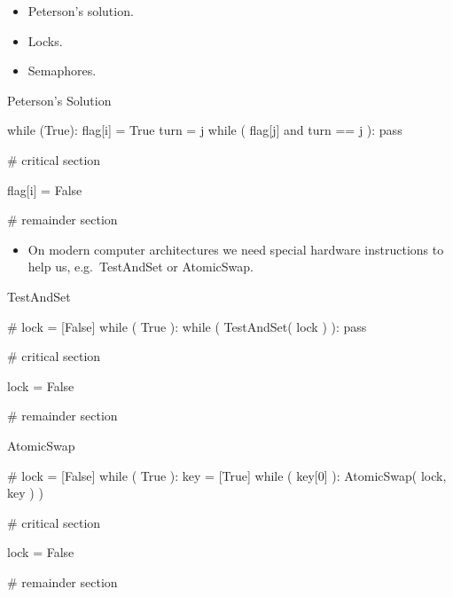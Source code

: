 \documentclass{beamer}
\begin{document}
\begin{frame}{\insertsubsectionhead}
  \begin{itemize}
    \item Peterson's solution.
    \item Locks.
    \item Semaphores.
  \end{itemize}
\end{frame}

\begin{frame}[fragile]{\insertsubsectionhead}{Peterson's Solution}
  \begin{source}[language=Python]
while (True):
  flag[i] = True
  turn = j
  while ( flag[j] and turn == j ):
    pass

  # critical section

  flag[i] = False

  # remainder section
  \end{source}
\end{frame}

\begin{frame}{\insertsubsectionhead}
  \begin{itemize}
    \item On modern computer architectures we need special hardware 
      instructions to help us, e.g.\ TestAndSet or AtomicSwap.
  \end{itemize}
\end{frame}

\begin{frame}[fragile]{\insertsubsectionhead}{TestAndSet}
  \begin{source}[language=Python]
# lock = [False]
while ( True ):
  while ( TestAndSet( lock ) ):
    pass

  # critical section

  lock = False

  # remainder section
  \end{source}
\end{frame}

\begin{frame}[fragile]{\insertsubsectionhead}{AtomicSwap}
  \begin{source}[language=Python]
# lock = [False]
while ( True ):
  key = [True]
  while ( key[0] ):
    AtomicSwap( lock, key ) )

  # critical section

  lock = False

  # remainder section
  \end{source}
\end{frame}
\end{document}
